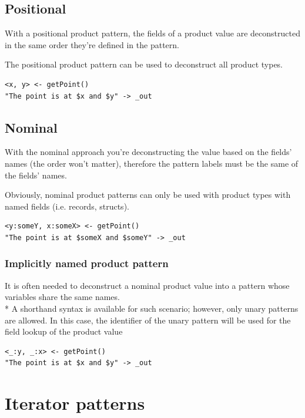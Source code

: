 \subsection{Positional}

With a positional product pattern, the fields of a product value are
deconstructed in the same order they're defined in the pattern.

The positional product pattern can be used to deconstruct all product types.

\begin{verbatim}
<x, y> <- getPoint()
"The point is at $x and $y" -> _out
\end{verbatim}

\subsection{Nominal}

With the nominal approach you're deconstructing the value based on the fields'
names (the order won't matter), therefore the pattern labels must be the same
of the fields' names.

Obviously, nominal product patterns can only be used with product types with
named fields (i.e. records, structs).

\begin{verbatim}
<y:someY, x:someX> <- getPoint()
"The point is at $someX and $someY" -> _out
\end{verbatim}

\subsubsection{Implicitly named product pattern}

It is often needed to deconstruct a nominal product value into a pattern whose
variables share the same names.\\*
A shorthand syntax is available for such scenario; however, only unary patterns
are allowed. In this case, the identifier of the unary pattern will be used for
the field lookup of the product value

\begin{verbatim}
<_:y, _:x> <- getPoint()
"The point is at $x and $y" -> _out
\end{verbatim}

\clearpage

\section{Iterator patterns}

